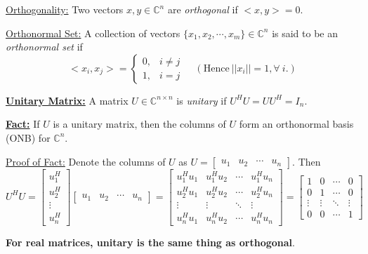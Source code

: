 \documentclass[letterpaper]{article}
\newcommand{\cp}{\mathbb C}    %
\begin{document}
\noindent \underline{Orthogonality:} Two vectors $x,y\in \cp^n$ are \textit{orthogonal} if $<x,y>=0$.

\noindent \underline{Orthonormal Set:} A collection of vectors $\{x_1,x_2,\cdots,x_m\}\in \cp^n$ is said to be an \textit{orthonormal set} if
$$<x_i,x_j>=\left\{\begin{array}{ll}
0, & i\not=j\\
1, & i=j
\end{array}\right.~~~~~(\text{Hence}~||x_i||=1, \forall~i.)$$

\noindent \textbf{\underline{Unitary Matrix:}} A matrix $U \in \cp^{n\times n}$ is \textit{unitary} if $U^H U = U U^H=I_n$.

\newpage

\noindent \textbf{\underline{Fact:}} If $U$ is a unitary matrix, then the columns of $U$ form an orthonormal basis (ONB) for $\cp^n$.

\noindent \underline{Proof of Fact:} Denote the columns of $U$ as $U=\begin{bmatrix}u_1 & u_2 & \cdots & u_n \end{bmatrix}$. Then
$$U^H U =\begin{bmatrix}u^H_1 \\[2ex] u^H_2 \\ \vdots \\[2ex] u^H_n \end{bmatrix}\begin{bmatrix}u_1 & u_2 & \cdots & u_n \end{bmatrix}=\left[\begin{array}{cccc} u^H_1 u_1 & u^H_1 u_2 & \cdots & u^H_1 u_n \\[2ex] u^H_2 u_1 & u^H_2 u_2 & \cdots & u^H_2 u_n \\[2ex] \vdots & \vdots &\ddots & \vdots \\[2ex] u^H_n u_1 & u^H_n u_2 & \cdots & u^H_n u_n\end{array}\right]=\left[\begin{array}{cccc} 1 & 0 & \cdots & 0 \\ 0 & 1 & \cdots & 0 \\ \vdots & \vdots &\ddots & \vdots \\ 0 & 0 & \cdots & 1\end{array}\right]$$

\vspace*{1cm}

\textbf{For real matrices, unitary is the same thing as orthogonal}.
\end{document}
